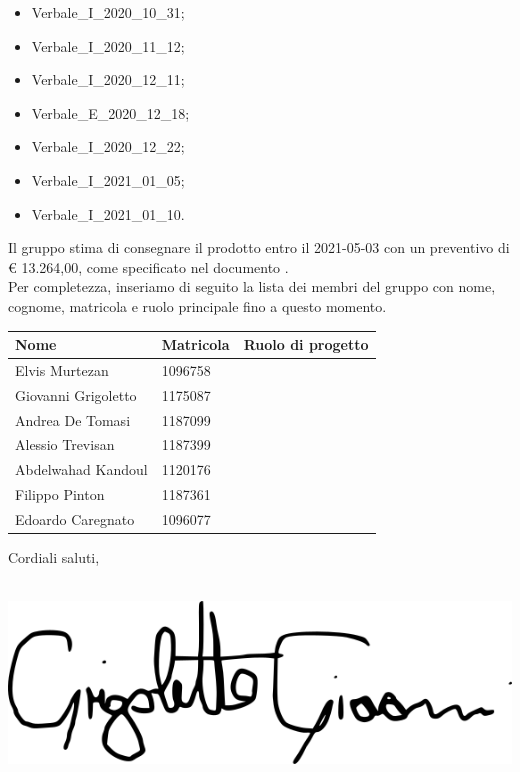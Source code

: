 \documentclass[a4paper, oneside, openany, dvipsnames, table,11pt]{letter}
\begin{document}
\begin{letter}
\begin{itemize}
            \item Verbale\_I\_2020\_10\_31;
            \item Verbale\_I\_2020\_11\_12;
            \item Verbale\_I\_2020\_12\_11;
            \item Verbale\_E\_2020\_12\_18;
            \item Verbale\_I\_2020\_12\_22;
           \item Verbale\_I\_2021\_01\_05;
           \item Verbale\_I\_2021\_01\_10.
        \end{itemize}
        Il gruppo stima di consegnare il prodotto entro il 2021-05-03 con un preventivo di \euro{} 13.264,00, come specificato nel documento \PdPv{}.\\
        Per completezza, inseriamo di seguito la lista dei membri del gruppo con nome, cognome, matricola e ruolo principale fino a questo momento.
        {
            \renewcommand{\arraystretch}{2}
            \begin{longtable}{ C{4cm} C{3cm} C{6cm} }
                \rowcolor{\primaryColor}
                \textcolor{\secondaryColor}{\textbf{Nome}} & \textcolor{\secondaryColor}{\textbf{Matricola}} & \textcolor{\secondaryColor}{\textbf{Ruolo di progetto}}\\
                \endhead 
                {Elvis Murtezan} & 1096758 & \responsabile{}  \\   
                {Giovanni Grigoletto} & 1175087 & \responsabile{}  \\    
                {Andrea De Tomasi} & 1187099 & \verificatore{}   \\    
                {Alessio Trevisan} & 1187399 & \analista{}  \\    
                {Abdelwahad Kandoul} & 1120176 & \verificatore{}  \\    
                {Filippo Pinton} & 1187361 &   \amministratore{}  \\    
                {Edoardo Caregnato} & 1096077 & \analista{}  \\       
            \end{longtable}
        }
        Cordiali saluti,
        \closing{\textit{\responsabile{}}\\ \includegraphics[width=.5\linewidth]{./immagini/firme/giovanni.png}}
    \end{letter}
\end{document}
